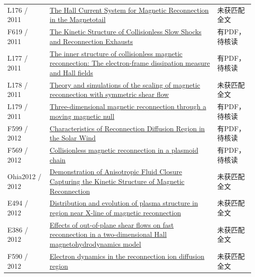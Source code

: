 \begin{longtable}{P{24mm}P{97mm}P{27mm}}
L176 / 2011 & \href{https://doi.org/10.1029/156gm18}{The Hall Current System for Magnetic Reconnection in the Magnetotail} & 未获匹配全文\\

F619 / 2011 & \href{http://hdl.handle.net/1903/11865}{The Kinetic Structure of Collisionless Slow Shocks and Reconnection Exhausts} & 有PDF，待核读\\

L177 / 2011 & \href{https://doi.org/10.1063/1.3662430}{The inner structure of collisionless magnetic reconnection: The electron-frame dissipation measure and Hall fields} & 有PDF，待核读\\

L178 / 2011 & \href{https://doi.org/10.1063/1.3602859}{Theory and simulations of the scaling of magnetic reconnection with symmetric shear flow} & 未获匹配全文\\

L179 / 2011 & \href{https://doi.org/10.5194/npg-18-871-2011}{Three-dimensional magnetic reconnection through a moving magnetic null} & 有PDF，待核读\\

F599 / 2012 & \href{https://doi.org/10.11728/cjss2012.06.778}{Characteristics of Reconnection Diffusion Region in the Solar Wind} & 有PDF，待核读\\

F569 / 2012 & \href{https://doi.org/10.5194/npg-19-145-2012}{Collisionless magnetic reconnection in a plasmoid chain} & 有PDF，待核读\\

Ohia2012 / 2012 & \href{https://doi.org/10.1103/PhysRevLett.109.115004}{Demonstration of Anisotropic Fluid Closure Capturing the Kinetic Structure of Magnetic Reconnection} & 未获匹配全文\\

E494 / 2012 & \href{http://en.cnki.com.cn/Article_en/CJFDTOTAL-NCDL201203012.htm}{Distribution and evolution of plasma structure in region near X-line of magnetic reconnection} & 未获匹配全文\\

E386 / 2012 & \href{https://doi.org/10.1063/1.3697561}{Effects of out-of-plane shear flows on fast reconnection in a two-dimensional Hall magnetohydrodynamics model} & 未获匹配全文\\

F590 / 2012 & \href{https://doi.org/10.1029/2012ja017896}{Electron dynamics in the reconnection ion diffusion region} & 未获匹配全文\\


\end{longtable}
